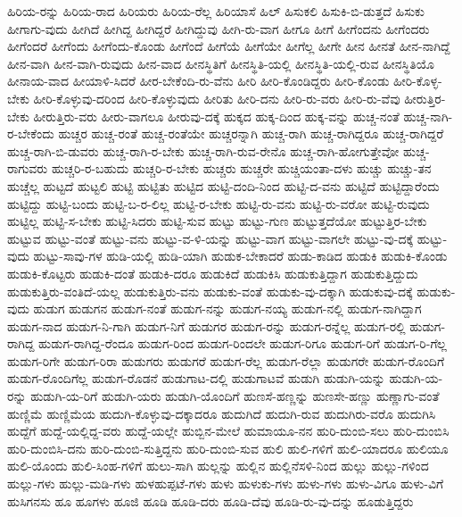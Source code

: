 {ಹಿರಿಯ-ರನ್ನು
ಹಿರಿಯ-ರಾದ
ಹಿರಿಯರು
ಹಿರಿಯ-ರೆಲ್ಲ
ಹಿರಿಯಾಸೆ
ಹಿಲ್
ಹಿಸುಕಲಿ
ಹಿಸುಕಿ-ಬಿ-ಡುತ್ತದೆ
ಹಿಸುಕು
ಹೀಗಾಗು-ವುದು
ಹೀಗಿದೆ
ಹೀಗಿದ್ದ
ಹೀಗಿದ್ದರೆ
ಹೀಗಿದ್ದುವು
ಹೀಗಿ-ರು-ವಾಗ
ಹೀಗೂ
ಹೀಗೆ
ಹೀಗೆಂದನು
ಹೀಗೆಂದರು
ಹೀಗೆಂದರೆ
ಹೀಗೆಂದು
ಹೀಗೆಂದು-ಕೊಂಡು
ಹೀಗೆಂದೆ
ಹೀಗೆಯೆ
ಹೀಗೆಯೇ
ಹೀಗೆಲ್ಲ
ಹೀಗೇ
ಹೀನ
ಹೀನತೆ
ಹೀನ-ನಾಗಿದ್ದೆ
ಹೀನ-ವಾಗಿ
ಹೀನ-ವಾಗಿ-ರುವುದು
ಹೀನ-ವಾದ
ಹೀನಸ್ಥಿತಿಗೆ
ಹೀನಸ್ಥಿತಿ-ಯಲ್ಲಿ
ಹೀನಸ್ಥಿತಿ-ಯಲ್ಲಿ-ರುವ
ಹೀನಸ್ಥಿತಿಯೊ
ಹೀನಾಯ-ವಾದ
ಹೀಯಾಳಿ-ಸಿದರೆ
ಹೀರ-ಬೇಕೆಂದಿ-ರು-ವೆನು
ಹೀರಿ
ಹೀರಿ-ಕೊಂಡಿದ್ದರು
ಹೀರಿ-ಕೊಂಡು
ಹೀರಿ-ಕೊಳ್ಳ-ಬೇಕು
ಹೀರಿ-ಕೊಳ್ಳುವು-ದರಿಂದ
ಹೀರಿ-ಕೊಳ್ಳುವುದು
ಹೀರಿತು
ಹೀರಿ-ದನು
ಹೀರಿ-ರು-ವರು
ಹೀರಿ-ರು-ವೆವು
ಹೀರುತ್ತಿರ-ಬೇಕು
ಹೀರುತ್ತಿರು-ವರು
ಹೀರು-ವಾಗಲೂ
ಹೀರುವು-ದಕ್ಕೆ
ಹುಕ್ಕದ
ಹುಕ್ಕ-ದಿಂದ
ಹುಕ್ಕ-ವನ್ನು
ಹುಚ್ಚ-ನಂತೆ
ಹುಚ್ಚ-ನಾಗಿ-ರ-ಬೇಕೆಂದು
ಹುಚ್ಚರ
ಹುಚ್ಚ-ರಂತೆ
ಹುಚ್ಚ-ರಂತೆಯೇ
ಹುಚ್ಚರನ್ನಾಗಿ
ಹುಚ್ಚ-ರಾಗಿ
ಹುಚ್ಚ-ರಾಗಿದ್ದರೂ
ಹುಚ್ಚ-ರಾಗಿದ್ದರೆ
ಹುಚ್ಚ-ರಾಗಿ-ಬಿ-ಡುವರು
ಹುಚ್ಚ-ರಾಗಿ-ರ-ಬೇಕು
ಹುಚ್ಚ-ರಾಗಿ-ರುವ-ರೇನೊ
ಹುಚ್ಚ-ರಾಗಿ-ಹೋಗುತ್ತೇವೋ
ಹುಚ್ಚ-ರಾಗುವರು
ಹುಚ್ಚರಿ-ರ-ಬಹುದು
ಹುಚ್ಚರಿ-ರ-ಬೇಕು
ಹುಚ್ಚರು
ಹುಚ್ಚರೇ
ಹುಚ್ಚಿಯಂತಾ-ದಳು
ಹುಚ್ಚು
ಹುಚ್ಚು-ತನ
ಹುಚ್ಚೆಲ್ಲ
ಹುಟ್ಟದೆ
ಹುಟ್ಟಲಿ
ಹುಟ್ಟಿ
ಹುಟ್ಟಿತು
ಹುಟ್ಟಿದ
ಹುಟ್ಟಿ-ದಂದಿ-ನಿಂದ
ಹುಟ್ಟಿ-ದ-ವನು
ಹುಟ್ಟಿದೆ
ಹುಟ್ಟಿದ್ದಾರೆಂದು
ಹುಟ್ಟಿದ್ದು
ಹುಟ್ಟಿ-ಬಂದು
ಹುಟ್ಟಿ-ಬ-ರ-ಲಿಲ್ಲ
ಹುಟ್ಟಿ-ರ-ಬೇಕು
ಹುಟ್ಟಿ-ರು-ವನು
ಹುಟ್ಟಿ-ರು-ವರೋ
ಹುಟ್ಟಿ-ರುವುದು
ಹುಟ್ಟಿಲ್ಲ
ಹುಟ್ಟಿ-ಸ-ಬೇಕು
ಹುಟ್ಟಿ-ಸಿದರು
ಹುಟ್ಟಿ-ಸುವ
ಹುಟ್ಟು
ಹುಟ್ಟು-ಗುಣ
ಹುಟ್ಟುತ್ತದೆಯೋ
ಹುಟ್ಟುತ್ತಿರ-ಬೇಕು
ಹುಟ್ಟುವ
ಹುಟ್ಟು-ವಂತೆ
ಹುಟ್ಟು-ವನು
ಹುಟ್ಟು-ವ-ಳಿ-ಯನ್ನು
ಹುಟ್ಟು-ವಾಗ
ಹುಟ್ಟು-ವಾಗಲೇ
ಹುಟ್ಟು-ವು-ದಕ್ಕೆ
ಹುಟ್ಟು-ವುದು
ಹುಟ್ಟು-ಸಾವು-ಗಳ
ಹುಡಿ-ಯಲ್ಲಿ
ಹುಡಿ-ಯಾಗಿ
ಹುಡುಕ-ಬೇಕಾದರೆ
ಹುಡು-ಕಾಡಿದ
ಹುಡುಕಿ
ಹುಡುಕಿ-ಕೊಂಡು
ಹುಡುಕಿ-ಕೊಟ್ಟರು
ಹುಡುಕಿ-ದಂತೆ
ಹುಡುಕಿ-ದರೂ
ಹುಡುಕಿದೆ
ಹುಡುಕಿಸಿ
ಹುಡುಕುತ್ತಿದ್ದಾಗ
ಹುಡುಕುತ್ತಿದ್ದುದು
ಹುಡುಕುತ್ತಿರು-ವಂತಿದೆ-ಯಲ್ಲ
ಹುಡುಕುತ್ತಿರು-ವನು
ಹುಡುಕು-ವಂತೆ
ಹುಡುಕು-ವು-ದಕ್ಕಾಗಿ
ಹುಡುಕುವು-ದಕ್ಕೆ
ಹುಡುಕು-ವುದು
ಹುಡುಗ
ಹುಡುಗನ
ಹುಡುಗ-ನಂತೆ
ಹುಡುಗ-ನನ್ನು
ಹುಡುಗ-ನಯ್ಯ
ಹುಡುಗ-ನಲ್ಲಿ
ಹುಡುಗ-ನಾಗಿದ್ದಾಗ
ಹುಡುಗ-ನಾದ
ಹುಡುಗ-ನಿ-ಗಾಗಿ
ಹುಡುಗ-ನಿಗೆ
ಹುಡುಗರ
ಹುಡುಗ-ರನ್ನು
ಹುಡುಗ-ರನ್ನೆಲ್ಲ
ಹುಡುಗ-ರಲ್ಲಿ
ಹುಡುಗ-ರಾಗಿದ್ದ
ಹುಡುಗ-ರಾಗಿದ್ದ-ರೆಂದೂ
ಹುಡುಗ-ರಿಂದ
ಹುಡುಗ-ರಿಂದಲೇ
ಹುಡುಗ-ರಿಗೂ
ಹುಡುಗ-ರಿಗೆ
ಹುಡುಗ-ರಿ-ಗೆಲ್ಲ
ಹುಡುಗ-ರಿಗೇ
ಹುಡುಗ-ರಿರಾ
ಹುಡುಗರು
ಹುಡುಗರೆ
ಹುಡುಗ-ರೆಲ್ಲ
ಹುಡುಗ-ರೆಲ್ಲಾ
ಹುಡುಗರೇ
ಹುಡುಗ-ರೊಂದಿಗೆ
ಹುಡುಗ-ರೊಂದಿಗೆಲ್ಲ
ಹುಡುಗ-ರೊಡನೆ
ಹುಡುಗಾಟ-ದಲ್ಲಿ
ಹುಡುಗಾಟವೆ
ಹುಡುಗಿ
ಹುಡುಗಿ-ಯನ್ನು
ಹುಡುಗಿ-ಯ-ರನ್ನು
ಹುಡುಗಿ-ಯ-ರಿಗೆ
ಹುಡುಗಿ-ಯರು
ಹುಡುಗಿ-ಯೊಂದಿಗೆ
ಹುಣಸೆ-ಹಣ್ಣನ್ನು
ಹುಣಸೇ-ಹಣ್ಣು
ಹುಣ್ಣಾಗು-ವಂತೆ
ಹುಣ್ಣಿಮೆ
ಹುಣ್ಣಿಮೆಯ
ಹುದುಗಿ-ಕೊಳ್ಳುವು-ದಕ್ಕಾದರೂ
ಹುದುಗಿದೆ
ಹುದುಗಿ-ರುವ
ಹುದುಗಿರು-ವರೊ
ಹುದುಗಿಸಿ
ಹುದ್ದೆಗೆ
ಹುದ್ದೆ-ಯಲ್ಲಿದ್ದ-ವರು
ಹುದ್ದೆ-ಯಲ್ಲೇ
ಹುಬ್ಬಿನ-ಮೇಲೆ
ಹುಮಾಯೂ-ನನ
ಹುರಿ-ದುಂಬಿ-ಸಲು
ಹುರಿ-ದುಂಬಿಸಿ
ಹುರಿ-ದುಂಬಿಸಿ-ದನು
ಹುರಿ-ದುಂಬಿ-ಸುತ್ತಿದ್ದನು
ಹುರಿ-ದುಂಬಿ-ಸುವ
ಹುಲಿ
ಹುಲಿ-ಗಳಿಗೆ
ಹುಲಿ-ಯಾದರೂ
ಹುಲಿಯೂ
ಹುಲಿ-ಯೊಂದು
ಹುಲಿ-ಸಿಂಹ-ಗಳಿಗೆ
ಹುಲು-ಸಾಗಿ
ಹುಲ್ಲನ್ನು
ಹುಲ್ಲಿನ
ಹುಲ್ಲಿನೆಸಳಿ-ನಿಂದ
ಹುಲ್ಲು
ಹುಲ್ಲು-ಗಳಿಂದ
ಹುಲ್ಲು-ಗಳು
ಹುಲ್ಲು-ಮಡಿ-ಗಳು
ಹುಳಹುಪ್ಪಟೆ-ಗಳು
ಹುಳು
ಹುಳುಕು-ಗಳು
ಹುಳು-ಗಳು
ಹುಳು-ವಿಗೂ
ಹುಳು-ವಿಗೆ
ಹುಸಿಗನಸು
ಹೂ
ಹೂಗಳು
ಹೂಜಿ
ಹೂಡಿ
ಹೂಡಿ-ದರು
ಹೂಡಿ-ದೆವು
ಹೂಡಿ-ರು-ವು-ದನ್ನು
ಹೂಡುತ್ತಿದ್ದರು
}
